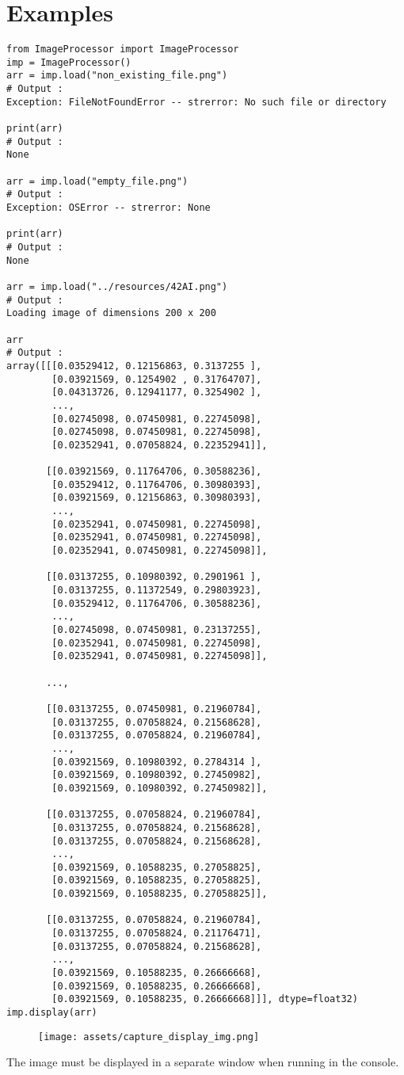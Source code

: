 \section*{Examples}
\begin{verbatim}
from ImageProcessor import ImageProcessor
imp = ImageProcessor()
arr = imp.load("non_existing_file.png")
# Output :
Exception: FileNotFoundError -- strerror: No such file or directory

print(arr)
# Output :
None

arr = imp.load("empty_file.png")
# Output :
Exception: OSError -- strerror: None

print(arr)
# Output :
None

arr = imp.load("../resources/42AI.png")
# Output :
Loading image of dimensions 200 x 200

arr
# Output :
array([[[0.03529412, 0.12156863, 0.3137255 ],
        [0.03921569, 0.1254902 , 0.31764707],
        [0.04313726, 0.12941177, 0.3254902 ],
        ...,
        [0.02745098, 0.07450981, 0.22745098],
        [0.02745098, 0.07450981, 0.22745098],
        [0.02352941, 0.07058824, 0.22352941]],

       [[0.03921569, 0.11764706, 0.30588236],
        [0.03529412, 0.11764706, 0.30980393],
        [0.03921569, 0.12156863, 0.30980393],
        ...,
        [0.02352941, 0.07450981, 0.22745098],
        [0.02352941, 0.07450981, 0.22745098],
        [0.02352941, 0.07450981, 0.22745098]],

       [[0.03137255, 0.10980392, 0.2901961 ],
        [0.03137255, 0.11372549, 0.29803923],
        [0.03529412, 0.11764706, 0.30588236],
        ...,
        [0.02745098, 0.07450981, 0.23137255],
        [0.02352941, 0.07450981, 0.22745098],
        [0.02352941, 0.07450981, 0.22745098]],

       ...,

       [[0.03137255, 0.07450981, 0.21960784],
        [0.03137255, 0.07058824, 0.21568628],
        [0.03137255, 0.07058824, 0.21960784],
        ...,
        [0.03921569, 0.10980392, 0.2784314 ],
        [0.03921569, 0.10980392, 0.27450982],
        [0.03921569, 0.10980392, 0.27450982]],

       [[0.03137255, 0.07058824, 0.21960784],
        [0.03137255, 0.07058824, 0.21568628],
        [0.03137255, 0.07058824, 0.21568628],
        ...,
        [0.03921569, 0.10588235, 0.27058825],
        [0.03921569, 0.10588235, 0.27058825],
        [0.03921569, 0.10588235, 0.27058825]],

       [[0.03137255, 0.07058824, 0.21960784],
        [0.03137255, 0.07058824, 0.21176471],
        [0.03137255, 0.07058824, 0.21568628],
        ...,
        [0.03921569, 0.10588235, 0.26666668],
        [0.03921569, 0.10588235, 0.26666668],
        [0.03921569, 0.10588235, 0.26666668]]], dtype=float32)
imp.display(arr)
\end{verbatim}
\begin{figure}[h!]
  \centering
  \texttt{[image: assets/capture\_display\_img.png]}
\end{figure}

The image must be displayed in a separate window when running in the console.